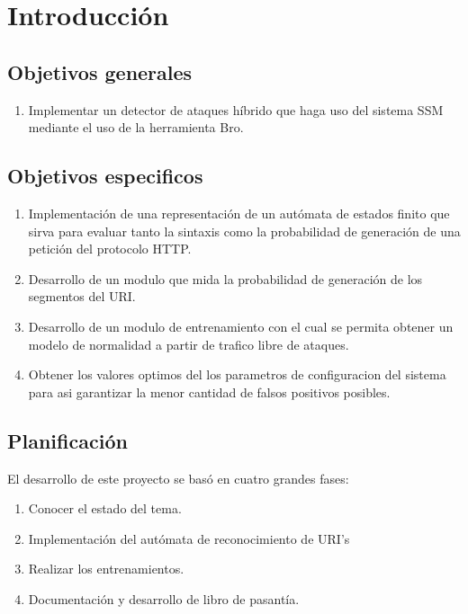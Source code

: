 \chapter{Introducción}
\label{capitulo1}


\section{Objetivos generales}
\begin{enumerate}
  \item Implementar un detector de ataques híbrido que haga uso del sistema SSM mediante el uso de la herramienta Bro.
\end{enumerate}


\section{Objetivos especificos}

\begin{enumerate}
  \item Implementación de una representación de un autómata de estados finito que sirva para evaluar tanto la sintaxis como la probabilidad de generación de una petición del protocolo HTTP.\\
  \item Desarrollo de un modulo que mida la probabilidad de generación de los segmentos del URI.\\
  \item Desarrollo de un modulo de entrenamiento con el cual se permita obtener un modelo de normalidad a partir de trafico libre de ataques.\\
  \item Obtener los valores optimos del los parametros de configuracion del sistema para asi garantizar la menor cantidad de falsos positivos posibles.\\
\end{enumerate}

\section{Planificación}

El desarrollo de este proyecto se bas\'o en cuatro grandes fases:
\begin{enumerate}
\item Conocer el estado  del tema.
\item Implementación del autómata de reconocimiento de URI's
\item Realizar los entrenamientos.
\item Documentación y desarrollo de libro de pasantía.
\end{enumerate}

